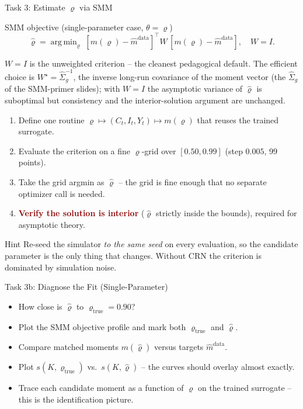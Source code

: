 \documentclass[10pt,aspectratio=169]{beamer}
\newcommand{\emphc}[1]{\textbf{\textcolor{darkred}{#1}}}
\DeclareMathOperator*{\argmin}{arg\,min}
\begin{document}
\begin{frame}[shrink=6]{Task 3: Estimate $\varrho$ via SMM}
\begin{block}{SMM objective (single-parameter case, $\theta = \varrho$)}
\vspace{-4pt}
\[\hat\varrho = \argmin_{\varrho}\; [m(\varrho) - \hat{m}^{\mathrm{data}}]^\top W \,[m(\varrho) - \hat{m}^{\mathrm{data}}], \quad W = I.\]
\vspace{-8pt}

{\scriptsize $W = I$ is the unweighted criterion -- the cleanest pedagogical default. The efficient choice is $W^\star = \widehat\Sigma_g^{-1}$, the inverse long-run covariance of the moment vector (the $\widehat\Sigma_g$ of the SMM-primer slides); with $W = I$ the asymptotic variance of $\hat\varrho$ is suboptimal but consistency and the interior-solution argument are unchanged.}
\end{block}
\begin{enumerate}
  \item Define one routine $\varrho \mapsto (C_t, I_t, Y_t) \mapsto m(\varrho)$ that reuses the trained surrogate.
  \item Evaluate the criterion on a fine $\varrho$-grid over $[0.50, 0.99]$ (step $0.005$, 99 points).
  \item Take the grid argmin as $\hat\varrho$ -- the grid is fine enough that no separate optimizer call is needed.
  \item \emphc{Verify the solution is interior} ($\hat\varrho$ strictly inside the bounds), required for asymptotic theory.
\end{enumerate}
\begin{alertblock}{Hint}
Re-seed the simulator \emph{to the same seed} on every evaluation, so the candidate parameter is the only thing that changes. Without CRN the criterion is dominated by simulation noise.
\end{alertblock}
\end{frame}

\begin{frame}{Task 3b: Diagnose the Fit (Single-Parameter)}
\begin{itemize}
  \item How close is $\hat\varrho$ to $\varrho_{\text{true}} = 0.90$?
  \item Plot the SMM objective profile and mark both $\varrho_{\text{true}}$ and $\hat\varrho$.
  \item Compare matched moments $m(\hat\varrho)$ versus targets $\hat{m}^{\mathrm{data}}$.
  \item Plot $s(K, \varrho_{\text{true}})$ vs.\ $s(K, \hat\varrho)$ -- the curves should overlay almost exactly.
  \item Trace each candidate moment as a function of $\varrho$ on the trained surrogate -- this is the identification picture.
\end{itemize}
\end{frame}
\end{document}
